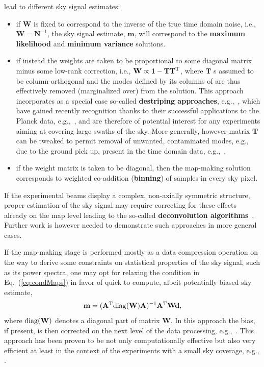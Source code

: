 lead to different sky signal estimates:
\begin{itemize}
\item if $\mathbf{W}$ is
fixed to correspond to the inverse of the true time domain noise, i.e., $\mathbf{W} = \mathbf{N}^{-1}$,
the sky signal estimate, $\mathbf{m}$, will correspond to the {\bf maximum likelihood} and {\bf minimum variance}
solutions. 
\item if instead the weights are taken to be proportional to some diagonal matrix minus some low-rank correction,
i.e., $\mathbf{W} \propto \mathbf{1} - \mathbf{T}\mathbf{T}^{\rm T}$,  where $\mathbf{T}$ s assumed to be column-orthogonal and the modes defined by its columns of 
are thus effectively removed (marginalized over)
from the solution. This approach incorporates as a special case so-called {\bf destriping approaches}, e.g.,~\cite{Poutanen2004, Keihanen2004}, which have gained
recently recognition thanks to their successful applications to the Planck data, e.g.,~\cite{Keihanen2010, Tristram2011, LFIMaps2015, HFImaps2015}, and are therefore of potential
interest for any 
experiments aiming at covering large swaths of the sky.
More generally, however matrix $\mathbf{T}$ can be tweaked to permit removal of unwanted, contaminated modes, e.g., 
due to the ground pick up, present in the time domain data, e.g.,~\cite{Stompor2001, Cantalupo2010, Dunner2013}.
\item if the weight matrix is taken to be diagonal, then the map-making solution corresponds to weighted co-addition
({\bf binning}) of samples in every sky pixel.
\end{itemize}
If the experimental beams display a complex, non-axially symmetric structure, proper estimation of the sky signal
may require correcting for these effects already on the map level leading to the so-called {\bf deconvolution algorithms}~\cite{ArmitageWandelt2004, Harrison2011, KeihanenReinecke2012}.  Further work is
however needed to demonstrate such approaches in more general cases.

If the map-making stage is performed mostly as a data compression operation on the way to derive some constraints
on statistical properties of the sky signal, such as its power spectra, one may opt for relaxing the condition in Eq.~(\ref{eq:condMaps})
in favor of quick to compute, albeit potentially biased sky estimate,
\begin{eqnarray}
\mathbf{m} = (\mathbf{A}^{\rm T} {\rm diag}( \mathbf{W}) \mathbf{A})^{-1} \mathbf{A}^{\rm T}\mathbf{W} \mathbf{d},
\end{eqnarray}
where ${\rm diag}( \mathbf{W})$ denotes a diagonal part of matrix $\mathbf{W}$.
In this approach the bias, if present, is then corrected on the next level of the data processing, e.g.,~\cite{Hivon2002}. This approach has been
proven to be not only computationally effective but also very efficient at least in the context of the experiments with a 
small sky coverage, e.g., \cite{QUAD2010, SPT2011, POLARBEAR, BICEP2014}.

